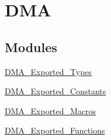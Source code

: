 \hypertarget{group__DMA}{
\section{DMA}
\label{group__DMA}
}
\subsection*{Modules}
\begin{DoxyCompactItemize}
\item 
\hyperlink{group__DMA__Exported__Types}{DMA\_\-Exported\_\-Types}
\item 
\hyperlink{group__DMA__Exported__Constants}{DMA\_\-Exported\_\-Constants}
\item 
\hyperlink{group__DMA__Exported__Macros}{DMA\_\-Exported\_\-Macros}
\item 
\hyperlink{group__DMA__Exported__Functions}{DMA\_\-Exported\_\-Functions}
\end{DoxyCompactItemize}
